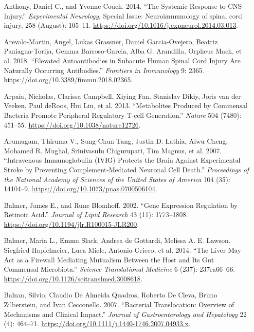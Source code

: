 \documentclass[9pt,lineno]{elife}
\newlength{\cslhangindent}
\newlength{\cslentryspacingunit} %
\newenvironment{CSLReferences}[2] %
 {%
  \setlength{\parindent}{0pt}
  \ifodd #1
  \let\oldpar\par
  \def\par{\hangindent=\cslhangindent\oldpar}
  \fi
  \setlength{\parskip}{#2\cslentryspacingunit}
 }%
 {}
\begin{document}
\begin{CSLReferences}{1}{0}
\leavevmode{}%
Anthony, Daniel C., and Yvonne Couch. 2014. {``The Systemic Response to {CNS} Injury.''} \emph{Experimental Neurology}, Special {Issue}: {Neuroimmunology} of spinal cord injury, 258 (August): 105--11. \url{https://doi.org/10.1016/j.expneurol.2014.03.013}.

\leavevmode{}%
Arevalo-Martin, Angel, Lukas Grassner, Daniel Garcia-Ovejero, Beatriz Paniagua-Torija, Gemma Barroso-Garcia, Alba G. Arandilla, Orpheus Mach, et al. 2018. {``Elevated {Autoantibodies} in {Subacute Human Spinal Cord Injury Are Naturally Occurring Antibodies}.''} \emph{Frontiers in Immunology} 9: 2365. \url{https://doi.org/10.3389/fimmu.2018.02365}.

\leavevmode{}%
Arpaia, Nicholas, Clarissa Campbell, Xiying Fan, Stanislav Dikiy, Joris van der Veeken, Paul deRoos, Hui Liu, et al. 2013. {``Metabolites Produced by Commensal Bacteria Promote Peripheral Regulatory {T-cell} Generation.''} \emph{Nature} 504 (7480): 451--55. \url{https://doi.org/10.1038/nature12726}.

\leavevmode{}%
Arumugam, Thiruma V., Sung-Chun Tang, Justin D. Lathia, Aiwu Cheng, Mohamed R. Mughal, Srinivasulu Chigurupati, Tim Magnus, et al. 2007. {``Intravenous Immunoglobulin ({IVIG}) Protects the Brain Against Experimental Stroke by Preventing Complement-Mediated Neuronal Cell Death.''} \emph{Proceedings of the National Academy of Sciences of the United States of America} 104 (35): 14104--9. \url{https://doi.org/10.1073/pnas.0700506104}.

\leavevmode{}%
Balmer, James E., and Rune Blomhoff. 2002. {``Gene Expression Regulation by Retinoic Acid.''} \emph{Journal of Lipid Research} 43 (11): 1773--1808. \url{https://doi.org/10.1194/jlr.R100015-JLR200}.

\leavevmode{}%
Balmer, Maria L., Emma Slack, Andrea de Gottardi, Melissa A. E. Lawson, Siegfried Hapfelmeier, Luca Miele, Antonio Grieco, et al. 2014. {``The {Liver May Act} as a {Firewall Mediating Mutualism Between} the {Host} and {Its Gut Commensal Microbiota}.''} \emph{Science Translational Medicine} 6 (237): 237ra66--66. \url{https://doi.org/10.1126/scitranslmed.3008618}.

\leavevmode{}%
Balzan, Silvio, Claudio De Almeida Quadros, Roberto De Cleva, Bruno Zilberstein, and Ivan Cecconello. 2007. {``Bacterial Translocation: {Overview} of Mechanisms and Clinical Impact.''} \emph{Journal of Gastroenterology and Hepatology} 22 (4): 464--71. \url{https://doi.org/10.1111/j.1440-1746.2007.04933.x}.


\end{CSLReferences}
\end{document}
